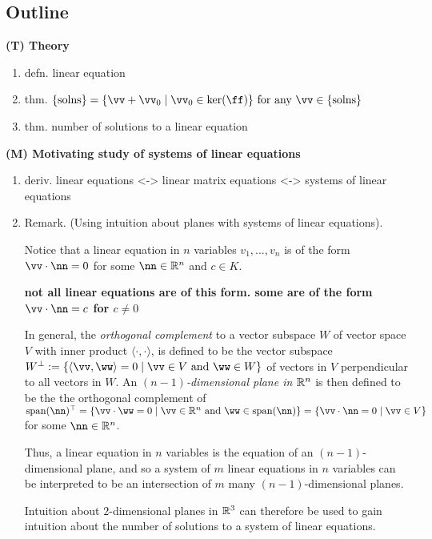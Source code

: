 \newpage

\subsection*{Outline}

\textbf{(T) Theory}
\begin{enumerate}
    \item defn. linear equation
    \item thm. $\{\text{solns}\} = \{ \vv + \vv_0 \mid \vv_0 \in \ker(\ff) \} \text{ for any $\vv \in \{\text{solns}\}$}$
    \item thm. number of solutions to a linear equation
\end{enumerate}

\textbf{(M) Motivating study of systems of linear equations}
\begin{enumerate}
    \item deriv. linear equations <-> linear matrix equations <-> systems of linear equations
    \item Remark. (Using intuition about planes with systems of linear equations). 
    
    Notice that a linear equation in $n$ variables $v_1, ..., v_n$ is of the form $\vv \cdot \nn = 0$ for some $\nn \in \R^n$ and $c \in K$. 

    \textbf{not all linear equations are of this form. some are of the form $\vv \cdot \nn = c$ for $c \neq 0$}
    
    In general, the \textit{orthogonal complement} to a vector subspace $W$ of vector space $V$ with inner product $\langle \cdot, \cdot \rangle$, is defined to be the vector subspace $W^\perp := \{ \langle \vv, \ww \rangle = 0 \mid \vv \in V \text{ and } \ww \in W \}$ of vectors in $V$ perpendicular to all vectors in $W$. An \textit{$(n - 1)$-dimensional plane in $\mathbb{R}^n$} is then defined to be the the orthogonal complement of $\spann(\nn)^\top = \{ \vv \cdot \ww = 0 \mid \vv \in \R^n \text{ and } \ww \in \spann(\nn)\} = \{ \vv \cdot \nn = 0 \mid \vv \in V\}$ for some $\nn \in \R^n$.
    
    Thus, a linear equation in $n$ variables is the equation of an $(n - 1)$-dimensional plane, and so a system of $m$ linear equations in $n$ variables can be interpreted to be an intersection of $m$ many $(n - 1)$-dimensional planes.

    Intuition about $2$-dimensional planes in $\mathbb{R}^3$ can therefore be used to gain intuition about the number of solutions to a system of linear equations.
\end{enumerate}

